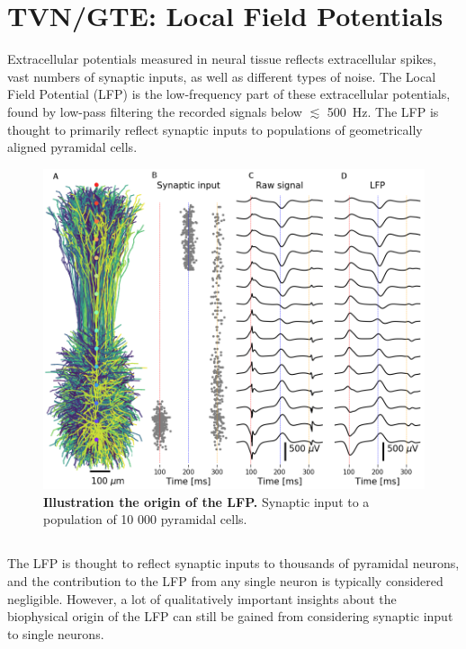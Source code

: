 \chapter{TVN/GTE: Local Field Potentials}
\label{chap:LFP}

Extracellular potentials measured in neural tissue reflects extracellular spikes, vast numbers of synaptic inputs, as well as different types of noise. The Local Field Potential (LFP) is the low-frequency part of these extracellular potentials, found by low-pass filtering the recorded signals below $\lesssim$ 500~Hz. The LFP is thought to primarily reflect synaptic inputs to populations of geometrically aligned pyramidal cells.

\begin{figure}[!ht]
\begin{center}
\includegraphics[width=.7\textwidth]{Figures/LFP/population_LFP.png}
\end{center}
\caption{\textbf{Illustration the origin of the LFP.}
Synaptic input to a population of 10 000 pyramidal cells.
}
\label{fig:LFP:LFP_pop_origin}
\end{figure}

\section{}
The LFP is thought to reflect synaptic inputs to thousands of pyramidal neurons, and the contribution to the LFP from any single neuron is typically considered negligible. However, a lot of qualitatively important insights about the biophysical origin of the LFP can still be gained from considering synaptic input to single neurons. 

